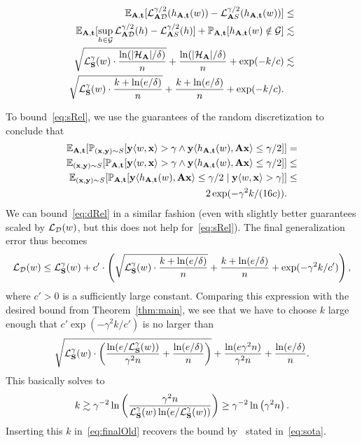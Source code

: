 \begin{align}
\mathbb{E}_{\mathbf{A},\mathbf{t}}[\mathcal{L}^{\gamma/2}_{\mathbf{A} \mathcal{D}}(h_{\mathbf{A},\mathbf{t}}(w)) -\mathcal{L}^{\gamma/2}_{\mathbf{A} S}(h_{\mathbf{A},\mathbf{t}}(w)) ] &\leq \nonumber\\
\mathbb{E}_{\mathbf{A},\mathbf{t}}[\sup_{h \in \mathcal{G}} \mathcal{L}^{\gamma/2}_{\mathbf{A} \mathcal{D}}(h) -\mathcal{L}^{\gamma/2}_{\mathbf{A} S}(h) ]  + \mathbb{P}_{\mathbf{A},\mathbf{t}}[h_{\mathbf{A},\mathbf{t}}(w) \notin \mathcal{G}]&\lesssim \nonumber\\
\sqrt{\mathcal{L}_{\mathbf{S}}^\gamma(w) \cdot \frac{\ln(|\mathcal{H}_{\mathbf{A}}|/\delta)}{n}}  + \frac{\ln(|\mathcal{H}_{\mathbf{A}}|/\delta)}{n} + \exp(-k/c) &\lesssim \nonumber\\
\sqrt{\mathcal{L}_{\mathbf{S}}^\gamma(w) \cdot \frac{k + \ln(e/\delta)}{n}} + \frac{k + \ln(e/\delta)}{n} + \exp(-k/c).\label{eq:boundgamma/2}
\end{align}

To bound~\eqref{eq:sRel}, we use the guarantees of the random discretization to conclude that
\begin{align*}
    \mathbb{E}_{\mathbf{A},\mathbf{t}}[\mathbb{P}_{(\mathbf{x},\mathbf{y}) \sim S}[\mathbf{y} \langle w, \mathbf{x}\rangle > \gamma \wedge \mathbf{y} \langle h_{\mathbf{A},\mathbf{t}}(w) , \mathbf{A} \mathbf{x}\rangle \leq \gamma/2]] &= \\
   \mathbb{E}_{(\mathbf{x},\mathbf{y}) \sim S}[ \mathbb{P}_{\mathbf{A},\mathbf{t}}[\mathbf{y} \langle w, \mathbf{x}\rangle > \gamma \wedge \mathbf{y} \langle h_{\mathbf{A},\mathbf{t}}(w) , \mathbf{A} \mathbf{x}\rangle \leq \gamma/2]] &\leq \\
   \mathbb{E}_{(\mathbf{x},\mathbf{y}) \sim S}[ \mathbb{P}_{\mathbf{A},\mathbf{t}}[ \mathbf{y} \langle h_{\mathbf{A},\mathbf{t}}(w) , \mathbf{A} \mathbf{x}\rangle \leq \gamma/2 \mid \mathbf{y} \langle w, \mathbf{x}\rangle > \gamma]] &\leq \\
   2\exp(-\gamma^2 k/(16c)).
\end{align*}
We can bound~\eqref{eq:dRel} in a similar fashion (even with slightly better guarantees scaled by $\mathcal{L}_{\mathcal{D}}(w)$, but this does not help for~\eqref{eq:sRel}). The final generalization error thus becomes
\begin{align}
    \mathcal{L}_{\mathcal{D}}(w) \leq \mathcal{L}_{\mathbf{S}}^\gamma(w) + c' \cdot \left(\sqrt{\mathcal{L}_{\mathbf{S}}^\gamma(w) \cdot \frac{k + \ln(e/\delta)}{n}} + \frac{k + \ln(e/\delta)}{n} + \exp(-\gamma^2 k/c') \right),\label{eq:finalOld}
\end{align}
where $c'>0$ is a sufficiently large constant. Comparing this expression with the desired bound from Theorem~\ref{thm:main}, we see that we have to choose $k$ large enough that $c'\exp(- \gamma^2 k/c')$ is no larger than
\[
\sqrt{\mathcal{L}^{\gamma}_{\mathbf{S}}(w) \cdot \left( \frac{ \ln(e/\mathcal{L}^{\gamma}_{\mathbf{S}}(w))}{\gamma^2 n} + \frac{\ln(e/\delta)}{n} \right)} + \frac{\ln(e\gamma^2 n)}{\gamma^2 n} + \frac{\ln(e/\delta)}{n}.
\]
This basically solves to 
\[
k \gtrsim  \gamma^{-2} \ln\left( \frac{\gamma^2 n}{\mathcal{L}_{\mathbf{S}}^\gamma(w) \ln(e/\mathcal{L}_{\mathbf{S}}^\gamma(w))} \right) \geq \gamma^{-2} \ln\left(\gamma^2 n\right).
\]
Inserting this $k$ in~\eqref{eq:finalOld} recovers the bound by~\cite{SVMbest} stated in~\eqref{eq:sota}.

